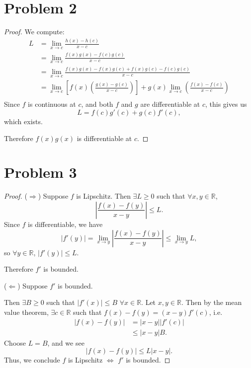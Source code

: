 \documentclass{article}
\newcommand{\R}{\mathbb{R}} %
\begin{document}
\section*{Problem 2}
\begin{proof}
	We compute:
	\begin{align}
		L &= \lim \limits_{x \to c} \frac{h(x) - h(c)}{x - c} \\
		&= \lim\limits_{x \to c} \frac{f(x)g(x) - f(c)g(c)}{x - c} \\
		&= \lim\limits_{x \to c} \frac{f(x)g(x) - f(x)g(c) + f(x)g(c) - f(c)g(c)}{x - c} \\
		&= \lim\limits_{x \to c} \left[f(x) \left(\frac{g(x) - g(c)}{x - c}\right)\right] + g(x) \lim\limits_{x \to c}\left(\frac{f(x) - f(c)}{x - c}\right) \\ 
	\end{align}
	Since $f$ is continuous at $c$, and both $f$ and $g$ are differentiable at $c$, this gives us
	\begin{equation}
		L = f(c)g'(c) + g(c)f'(c),
	\end{equation}
	which exists.
	
	Therefore $f(x)g(x)$ is differentiable at $c$.
\end{proof}
\section*{Problem 3}
\begin{proof}
	($\Rightarrow$) Suppose $f$ is Lipschitz. Then $\exists L \geq 0$ such that $\forall x, y \in \R$,
	\begin{equation}
		\left|\frac{f(x) - f(y)}{x - y}\right| \leq L.
	\end{equation}
	Since $f$ is differentiable, we have
	\begin{equation}
		|f'(y)| = \lim\limits_{x \to y} \left|\frac{f(x) - f(y)}{x - y}\right| \leq \lim\limits_{x \to y} L,
	\end{equation}
	so $\forall y \in \R$, $|f'(y)| \leq L$. 
	
	Therefore $f'$ is bounded.
	
	($\Leftarrow$) Suppose $f'$ is bounded.
	
	Then $\exists B \geq 0$ such that $|f'(x)| \leq B$ $\forall x \in \R$. Let $x, y \in \R$. Then by the mean value theorem, $\exists c \in \R$ such that $f(x) - f(y) = (x - y)f'(c)$, i.e.
	\begin{align}
		|f(x) - f(y)| &= |x - y||f'(c)| \\
		& \leq |x - y| B.
	\end{align}
	Choose $L = B$, and we see
	\begin{equation}
		|f(x) - f(y)| \leq L |x - y|.
	\end{equation}
	Thus, we conclude $f$ is Lipschitz $\iff$ $f'$ is bounded.
\end{proof}
\end{document}
